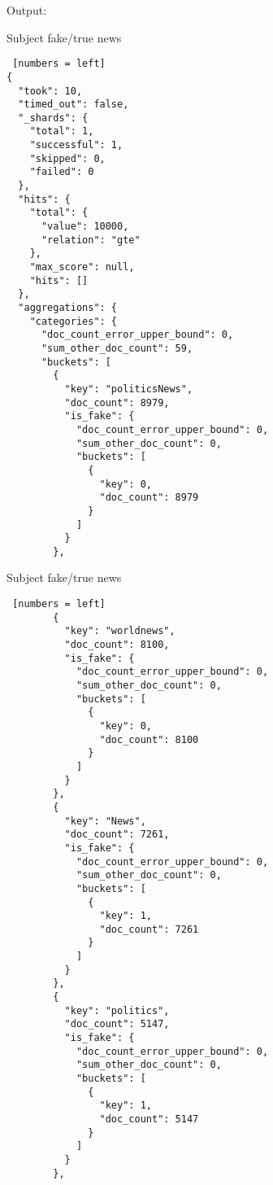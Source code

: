 Output:
\begin{algorithm}[h!]
\caption{Subject fake/true news}
\begin{lstlisting} [numbers = left]
{
  "took": 10,
  "timed_out": false,
  "_shards": {
    "total": 1,
    "successful": 1,
    "skipped": 0,
    "failed": 0
  },
  "hits": {
    "total": {
      "value": 10000,
      "relation": "gte"
    },
    "max_score": null,
    "hits": []
  },
  "aggregations": {
    "categories": {
      "doc_count_error_upper_bound": 0,
      "sum_other_doc_count": 59,
      "buckets": [
        {
          "key": "politicsNews",
          "doc_count": 8979,
          "is_fake": {
            "doc_count_error_upper_bound": 0,
            "sum_other_doc_count": 0,
            "buckets": [
              {
                "key": 0,
                "doc_count": 8979
              }
            ]
          }
        },

\end{lstlisting}
\end{algorithm}
\newpage
\begin{algorithm}[h!]
\caption{Subject fake/true news}
\begin{lstlisting} [numbers = left]
        {
          "key": "worldnews",
          "doc_count": 8100,
          "is_fake": {
            "doc_count_error_upper_bound": 0,
            "sum_other_doc_count": 0,
            "buckets": [
              {
                "key": 0,
                "doc_count": 8100
              }
            ]
          }
        },
        {
          "key": "News",
          "doc_count": 7261,
          "is_fake": {
            "doc_count_error_upper_bound": 0,
            "sum_other_doc_count": 0,
            "buckets": [
              {
                "key": 1,
                "doc_count": 7261
              }
            ]
          }
        },
        {
          "key": "politics",
          "doc_count": 5147,
          "is_fake": {
            "doc_count_error_upper_bound": 0,
            "sum_other_doc_count": 0,
            "buckets": [
              {
                "key": 1,
                "doc_count": 5147
              }
            ]
          }
        },
\end{lstlisting}
\end{algorithm}
\newpage
